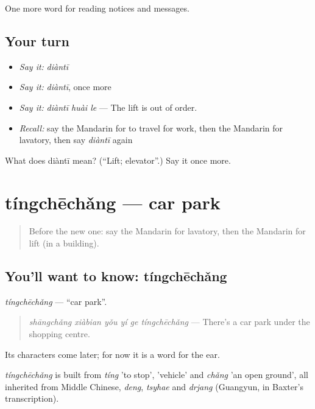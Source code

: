 \begin{grammarlens}[title={What you've built}]
One more word for reading notices and messages.
\end{grammarlens}

\subsection*{Your turn}
\begin{itemize}
\raggedright
  \item \emph{Say it:} \emph{diàntī}
  \item \emph{Say it:} \emph{diàntī}, once more
  \item \emph{Say it:} \emph{diàntī huài le} — The lift is out of order.
  \item \emph{Recall:} say the Mandarin for to travel for work, then the Mandarin for lavatory, then say \emph{diàntī} again
\end{itemize}

\begin{tcolorbox}[breakable,colback=teal!4,colframe=teal!35!black,title={Before you move on}]
What does diàntī mean? (\textquotedblleft{}Lift; elevator\textquotedblright{}.) Say it once more.
\end{tcolorbox}
\section[tíngchēchǎng]{tíngchēchǎng — car park}

\label{lesson:ZH-C192-tingchechang}



\begin{quote}
Before the new one: say the Mandarin for lavatory, then the Mandarin for lift (in a building).
\end{quote}

\subsection*{You'll want to know: tíngchēchǎng}
\emph{tíngchēchǎng} — \textquotedblleft{}car park\textquotedblright{}.

\begin{quote}
\emph{shāngchǎng xiàbian yǒu yí ge tíngchēchǎng} — There's a car park under the shopping centre.
\end{quote}

Its characters come later; for now it is a word for the ear.

\begin{cousinweb}
\emph{tíngchēchǎng} is built from \emph{tíng} 'to stop',  'vehicle' and \emph{chǎng} 'an open ground', all inherited from Middle Chinese, \emph{deng}, \emph{tsyhae} and \emph{drjang} (Guangyun, in Baxter's transcription).
\end{cousinweb}

